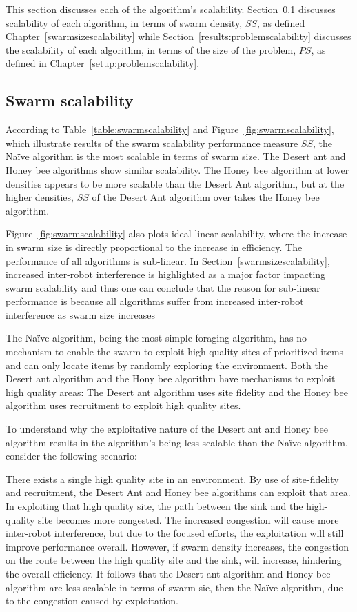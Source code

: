 This section discusses each of the algorithm's scalability. Section~\ref{results:swarmscalability} discusses scalability of each algorithm, in terms of swarm density, $SS$, as defined Chapter~\ref{swarmsizescalability} while Section~\ref{results:problemscalability} discusses the scalability of each algorithm, in terms of the size of the problem, $PS$, as defined in Chapter~\ref{setup:problemscalability}.

\subsection{Swarm scalability}
\label{results:swarmscalability}
According to Table~\ref{table:swarmscalability} and Figure~\ref{fig:swarmscalability}, which illustrate results of the swarm scalability performance measure $SS$, the Na\"ive algorithm is the most scalable in terms of swarm size. The Desert ant and Honey bee algorithms show similar scalability. The Honey bee algorithm at lower densities appears to be more scalable than the Desert Ant algorithm, but at the higher densities, $SS$ of the Desert Ant algorithm over takes the Honey bee algorithm.

Figure~\ref{fig:swarmscalability} also plots ideal linear scalability, where the increase in swarm size is directly proportional to the increase in efficiency. The performance of all algorithms is sub-linear. In Section~\ref{swarmsizescalability}, increased inter-robot interference is highlighted as a major factor impacting swarm scalability and thus one can conclude that the reason for sub-linear performance is because all algorithms suffer from increased inter-robot interference as swarm size increases

The Na\"ive algorithm, being the most simple foraging algorithm, has no mechanism to enable the swarm to exploit high quality sites of prioritized items and can only locate items by randomly exploring the environment. Both the Desert ant algorithm and the Hony bee algorithm have mechanisms to exploit high quality areas: The Desert ant algorithm uses site fidelity and the Honey bee algorithm uses recruitment to exploit high quality sites. 

To understand why the exploitative nature of the Desert ant and Honey bee algorithm results in the algorithm's being less scalable than the Na\"ive algorithm, consider the following scenario:

There exists a single high quality site in an environment. By use of site-fidelity and recruitment, the Desert Ant and Honey bee algorithms can exploit that area. In exploiting that high quality site, the path between the sink and the high-quality site becomes more congested. The increased congestion will cause more inter-robot interference, but due to the focused efforts, the exploitation will still improve performance overall. However, if swarm density increases, the congestion on the route between the high quality site and the sink, will increase, hindering the overall efficiency. It follows that the Desert ant algorithm and Honey bee algorithm are less scalable in terms of swarm sie, then the Na\"ive algorithm, due to the congestion caused by exploitation.

